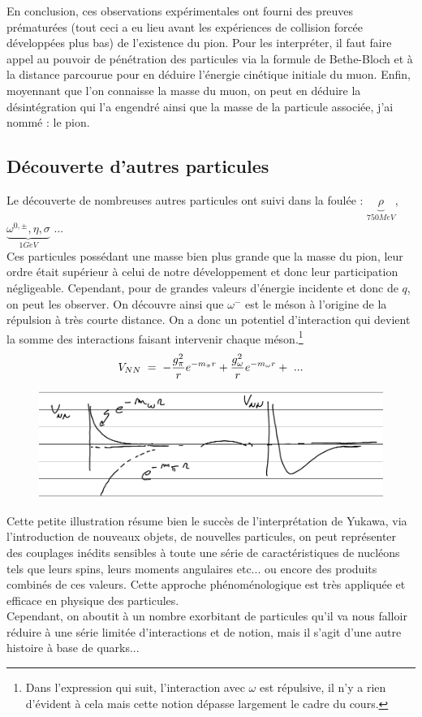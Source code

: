 En conclusion, ces observations expérimentales ont fourni des preuves prématurées (tout ceci a eu lieu avant les expériences de collision forcée développées plus bas) de l'existence du pion. Pour les interpréter, il faut faire appel au pouvoir de pénétration des particules via la formule de Bethe-Bloch et à la distance parcourue pour en déduire l'énergie cinétique initiale du muon. Enfin, moyennant que l'on connaisse la masse du muon, on peut en déduire la désintégration qui l'a engendré ainsi que la masse de la particule associée, j'ai nommé : le pion.

\subsection{Découverte d'autres particules}


Le découverte de nombreuses autres particules ont suivi dans la foulée : $\underbrace{\rho}_{750MeV}$, $\underbrace{\omega^{0,\pm},\eta, \sigma}_{1GeV}$ ...\\
Ces particules possédant une masse bien plus grande que la masse du pion, leur ordre était supérieur à celui de notre développement et donc leur participation négligeable. Cependant, pour de grandes valeurs d'énergie incidente et donc de $q$, on peut les observer. On découvre ainsi que $\omega^-$ est le méson à l'origine de la répulsion à très courte distance. On a donc un potentiel d'interaction qui devient la somme des interactions faisant intervenir chaque méson.\footnote{Dans l'expression qui suit, l'interaction avec $\omega$ est répulsive, il n'y a rien d'évident à cela mais cette notion dépasse largement le cadre du cours.}
\begin{equation*}
    V_{NN}\; = \; - \dfrac{g^2_\pi}{r}e^{-m_\pi r} +  \dfrac{g^2_\omega}{r}e^{-m_\omega r} +\ ...
\end{equation*}
\begin{figure}[H]
    \centering
    \includegraphics[scale = 0.8]{Images4/Potentiel NN.PNG}
\end{figure}
Cette petite illustration résume bien le succès de l'interprétation de Yukawa, via l'introduction de nouveaux objets, de nouvelles particules, on peut représenter des couplages inédits sensibles à toute une série de caractéristiques de nucléons tels que leurs spins, leurs moments angulaires etc... ou encore des produits combinés de ces valeurs. Cette approche phénoménologique est très appliquée et efficace en physique des particules.\\
Cependant, on aboutit à un nombre exorbitant de particules qu'il va nous falloir réduire à une série limitée d'interactions et de notion, mais il s'agit d'une autre histoire à base de quarks...
